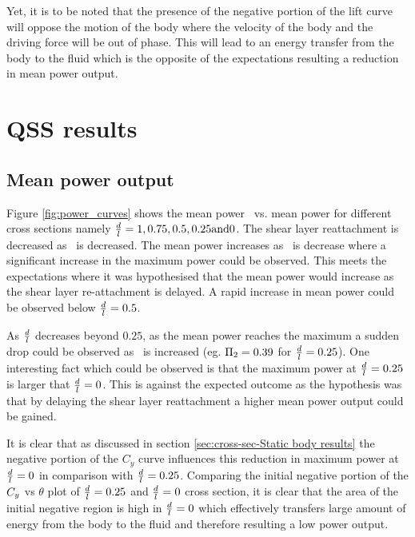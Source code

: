 Yet, it is to be noted that the presence of the negative portion of the lift curve will oppose the motion of the body where the velocity of the body and the driving force will be out of phase. This will lead to an energy transfer from the body to the fluid which is the opposite of the expectations resulting a reduction in mean power output.

 \section{QSS results}
  \label{sec:cross-sec-QSS}
  
 \subsection{Mean power output}
 \label{subsec:cross-sec-qss-mean power}
 

 
Figure \ref{fig:power_curves} shows the mean power \massdamp\ vs. mean power for different cross sections namely $\frac{d}{l}=1,0.75,0.5,0.25 \text{and} 0$. The shear layer reattachment is decreased as \ratio\ is decreased. The mean power increases as \ratio\ is decrease where a significant increase in the maximum power could be observed. This meets the expectations where it was hypothesised that the mean power would increase as the shear layer re-attachment is delayed. A rapid increase in mean power could be observed below $\frac{d}{l}=0.5$.

As $\frac{d}{l}$  decreases beyond $0.25$, as the mean power reaches the maximum a sudden drop could be observed as \massdamp\ is increased (eg. $\Pi_2=0.39$ for $\frac{d}{l}=0.25$). One interesting fact which could be observed is that the maximum power at $\frac{d}{l}=0.25$ is larger that $\frac{d}{l}=0$. This is against the expected outcome as the hypothesis was that by delaying the shear layer reattachment a higher mean power output could be gained.

It is clear that as discussed in section \ref{sec:cross-sec-Static body results} the negative portion of the $C_y$ curve influences this reduction in maximum power at $\frac{d}{l}=0$ in comparison with $\frac{d}{l}=0.25$. Comparing  the initial negative portion of the $C_{y}$ vs $\theta$ plot of $\frac{d}{l}=0.25$ and $\frac{d}{l}=0$ cross section, it is clear that the area of the initial negative region is high in $\frac{d}{l}=0$ which effectively transfers large amount of energy from the body to the fluid and therefore resulting a low power output.  


